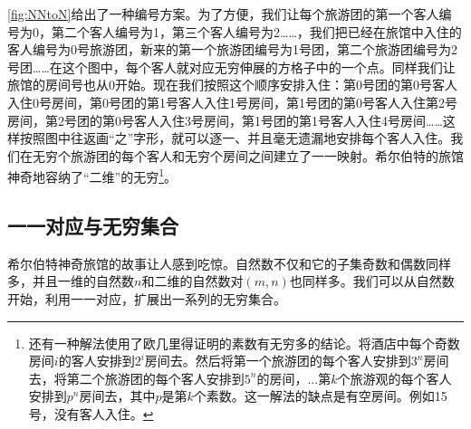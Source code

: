\documentclass[b5paper]{ctexart}
\begin{document}
\cref{fig:NNtoN}给出了一种编号方案。为了方便，我们让每个旅游团的第一个客人编号为0，第二个客人编号为1，第三个客人编号为2……，我们把已经在旅馆中入住的客人编号为0号旅游团，新来的第一个旅游团编号为1号团，第二个旅游团编号为2号团……在这个图中，每个客人就对应无穷伸展的方格子中的一个点。同样我们让旅馆的房间号也从0开始。现在我们按照这个顺序安排入住：第0号团的第0号客人入住0号房间，第0号团的第1号客人入住1号房间，第1号团的第0号客人入住第2号房间，第2号团的第0号客人入住3号房间，第1号团的第1号客人入住4号房间……这样按照图中往返画“之”字形，就可以逐一、并且毫无遗漏地安排每个客人入住。我们在无穷个旅游团的每个客人和无穷个房间之间建立了一一映射。希尔伯特的旅馆神奇地容纳了“二维”的无穷\footnote{还有一种解法使用了欧几里得证明的素数有无穷多的结论。将酒店中每个奇数房间$i$的客人安排到$2^i$房间去。然后将第一个旅游团的每个客人安排到$3^n$房间去，将第二个旅游团的每个客人安排到$5^n$的房间，...第$k$个旅游观的每个客人安排到$p^n$房间去，其中$p$是第$k$个素数。这一解法的缺点是有空房间。例如15号，没有客人入住。}。

\subsection{一一对应与无穷集合}

希尔伯特神奇旅馆的故事让人感到吃惊。自然数不仅和它的子集奇数和偶数同样多，并且一维的自然数$n$和二维的自然数对$(m, n)$也同样多。我们可以从自然数开始，利用一一对应，扩展出一系列的无穷集合。
\end{document}
